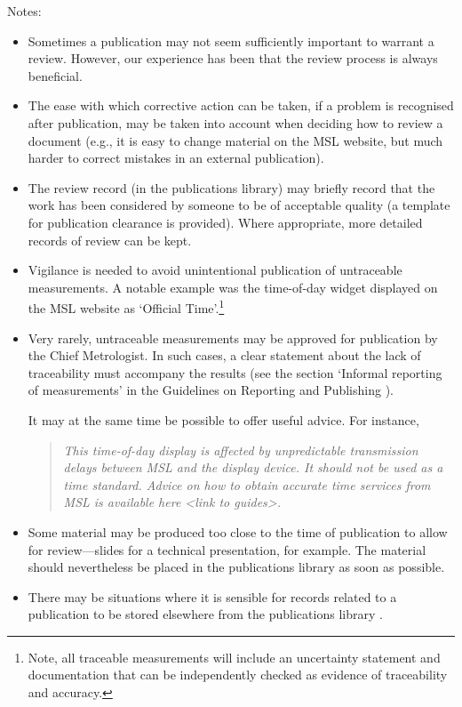 Notes: 
\begin{itemize}
\item Sometimes a publication may not seem sufficiently important to warrant a review. However, our experience has been that the review process is always beneficial.   
\item  The ease with which corrective action can be taken, if a problem is recognised after publication, may be taken into account when deciding how to review a document (e.g., it is easy to change material on the MSL website, but much harder to correct mistakes in an external publication). 
\item The review record  (in the publications library) may briefly record that the work has been considered by someone to be of acceptable quality (a template for publication clearance is provided). Where appropriate, more detailed records of review can be kept.
\item  Vigilance is needed to avoid unintentional publication of untraceable measurements. A notable example was the time-of-day widget displayed on the MSL website as `Official Time'.\footnote{Note, all traceable measurements will include an uncertainty statement and documentation that can be independently checked as evidence of traceability and accuracy.}
\item  Very rarely, untraceable measurements may be approved for publication by the Chief Metrologist. In such cases, a clear statement about the lack of traceability must accompany the results (see the section `Informal reporting of measurements' in the Guidelines on Reporting and Publishing \cite[\S\ref*{GRP-ss:informal_reporting}]{MSL_Reporting_Guidelines}). 

It may at the same time be possible to offer useful advice. For instance, 
\begin{quote}\textit{%
This time-of-day display is affected by unpredictable transmission delays between MSL and the display device. It should not be used as a time standard. Advice on how to obtain accurate time services from MSL is available here <link to guides>.
}\end{quote} 
\item  Some material may be produced too close to the time of publication to allow for review---slides for a technical presentation, for example. The material should nevertheless be placed in the publications library as soon as possible.
\item  There may be situations where it is sensible for records related to a publication to be stored elsewhere from the publications library .   
\end{itemize}

